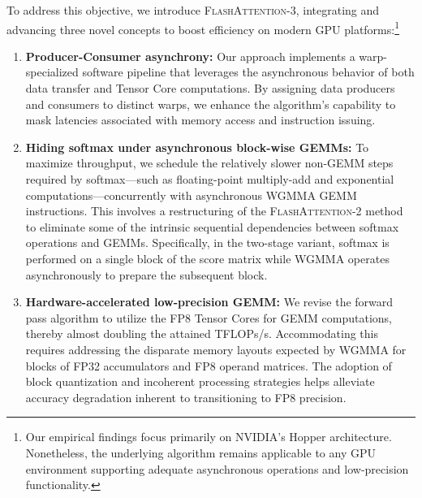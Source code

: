 To address this objective, we introduce \textsc{FlashAttention-3}, integrating and advancing three novel concepts to boost efficiency on modern GPU platforms:\footnote{Our empirical findings focus primarily on NVIDIA's Hopper architecture. Nonetheless, the underlying algorithm remains applicable to any GPU environment supporting adequate asynchronous operations and low-precision functionality.}

\begin{enumerate}

\item \textbf{Producer-Consumer asynchrony:} Our approach implements a warp-specialized software pipeline that leverages the asynchronous behavior of both data transfer and Tensor Core computations. By assigning data producers and consumers to distinct warps, we enhance the algorithm's capability to mask latencies associated with memory access and instruction issuing.
\item \textbf{Hiding softmax under asynchronous block-wise GEMMs:} To maximize throughput, we schedule the relatively slower non-GEMM steps required by softmax—such as floating-point multiply-add and exponential computations—concurrently with asynchronous WGMMA GEMM instructions. This involves a restructuring of the \textsc{FlashAttention-2} method to eliminate some of the intrinsic sequential dependencies between softmax operations and GEMMs. Specifically, in the two-stage variant, softmax is performed on a single block of the score matrix while WGMMA operates asynchronously to prepare the subsequent block.
\item \textbf{Hardware-accelerated low-precision GEMM:} We revise the forward pass algorithm to utilize the FP8 Tensor Cores for GEMM computations, thereby almost doubling the attained TFLOPs/s. Accommodating this requires addressing the disparate memory layouts expected by WGMMA for blocks of FP32 accumulators and FP8 operand matrices. The adoption of block quantization and incoherent processing strategies helps alleviate accuracy degradation inherent to transitioning to FP8 precision.
\end{enumerate}

